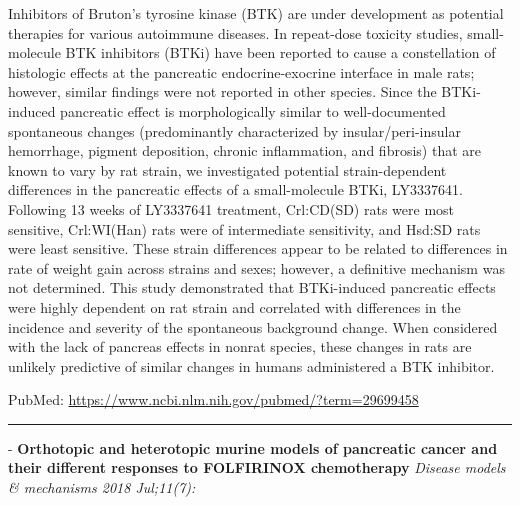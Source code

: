 \documentclass[]{article}
\begin{document}
Inhibitors of Bruton's tyrosine kinase (BTK) are under development as
potential therapies for various autoimmune diseases. In repeat-dose
toxicity studies, small-molecule BTK inhibitors (BTKi) have been
reported to cause a constellation of histologic effects at the
pancreatic endocrine-exocrine interface in male rats; however, similar
findings were not reported in other species. Since the BTKi-induced
pancreatic effect is morphologically similar to well-documented
spontaneous changes (predominantly characterized by insular/peri-insular
hemorrhage, pigment deposition, chronic inflammation, and fibrosis) that
are known to vary by rat strain, we investigated potential
strain-dependent differences in the pancreatic effects of a
small-molecule BTKi, LY3337641. Following 13 weeks of LY3337641
treatment, Crl:CD(SD) rats were most sensitive, Crl:WI(Han) rats were of
intermediate sensitivity, and Hsd:SD rats were least sensitive. These
strain differences appear to be related to differences in rate of weight
gain across strains and sexes; however, a definitive mechanism was not
determined. This study demonstrated that BTKi-induced pancreatic effects
were highly dependent on rat strain and correlated with differences in
the incidence and severity of the spontaneous background change. When
considered with the lack of pancreas effects in nonrat species, these
changes in rats are unlikely predictive of similar changes in humans
administered a BTK inhibitor.

PubMed: \url{https://www.ncbi.nlm.nih.gov/pubmed/?term=29699458}

{}

{}

\begin{center}\rule{0.5\linewidth}{\linethickness}\end{center}

 - \textbf{Orthotopic and heterotopic murine models of pancreatic cancer
and their different responses to FOLFIRINOX chemotherapy} \emph{Disease
models \& mechanisms 2018 Jul;11(7):}
\end{document}
